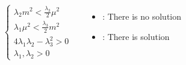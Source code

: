 \documentclass[10pt,xcolor=dvipsnames,mathserif]{beamer}
\newcommand{\xmark}{\ding{55}}%
\begin{document}

\begin{frame}
	
	\begin{columns}
		\begin{equation*}
		\begin{aligned}
		\begin{cases}
		\lambda_2 m^2 < \tfrac{\lambda_3}{2} \mu^2 \\
		\lambda_1 \mu^2 < \tfrac{\lambda_3}{2} m^2 \\
		4 \lambda_1 \lambda_2 - \lambda_3^2 >0 \\
		\lambda_1,\lambda_2 > 0
		\end{cases}	
		\end{aligned}
		\end{equation*}
		\begin{itemize}
			\item[] \xmark: There is no solution
			\item[] \checkmark: There is solution
		\end{itemize}
		
	\end{columns}
						

\end{frame}
\end{document}
